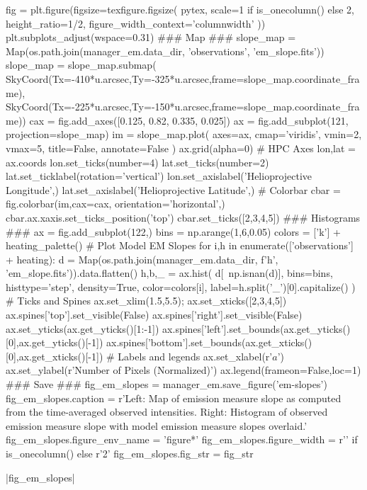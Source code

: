 \begin{pycode}[manager_em]
fig = plt.figure(figsize=texfigure.figsize(
    pytex,
    scale=1 if is_onecolumn() else 2,
    height_ratio=1/2,
    figure_width_context='columnwidth'
))
plt.subplots_adjust(wspace=0.31)
### Map ###
slope_map = Map(os.path.join(manager_em.data_dir, 'observations', 'em_slope.fits'))
slope_map = slope_map.submap(
    SkyCoord(Tx=-410*u.arcsec,Ty=-325*u.arcsec,frame=slope_map.coordinate_frame),
    SkyCoord(Tx=-225*u.arcsec,Ty=-150*u.arcsec,frame=slope_map.coordinate_frame))
cax = fig.add_axes([0.125, 0.82, 0.335, 0.025])
ax = fig.add_subplot(121, projection=slope_map)
im = slope_map.plot(
    axes=ax,
    cmap='viridis',
    vmin=2, vmax=5,
    title=False, annotate=False
)
ax.grid(alpha=0)
# HPC Axes
lon,lat = ax.coords
lon.set_ticks(number=4)
lat.set_ticks(number=2)
lat.set_ticklabel(rotation='vertical')
lon.set_axislabel('Helioprojective Longitude',)
lat.set_axislabel('Helioprojective Latitude',)
# Colorbar
cbar = fig.colorbar(im,cax=cax, orientation='horizontal',)
cbar.ax.xaxis.set_ticks_position('top')
cbar.set_ticks([2,3,4,5])
### Histograms ###
ax = fig.add_subplot(122,)
bins = np.arange(1,6,0.05)
colors = ['k'] + heating_palette()
# Plot Model EM Slopes
for i,h in enumerate(['observations'] + heating):
    d = Map(os.path.join(manager_em.data_dir, f'{h}', 'em_slope.fits')).data.flatten()
    h,b,_ = ax.hist(
        d[~np.isnan(d)],
        bins=bins,
        histtype='step',
        density=True,
        color=colors[i],
        label=h.split('_')[0].capitalize()
    )
# Ticks and Spines
ax.set_xlim(1.5,5.5);
ax.set_xticks([2,3,4,5])
ax.spines['top'].set_visible(False)
ax.spines['right'].set_visible(False)
ax.set_yticks(ax.get_yticks()[1:-1])
ax.spines['left'].set_bounds(ax.get_yticks()[0],ax.get_yticks()[-1])
ax.spines['bottom'].set_bounds(ax.get_xticks()[0],ax.get_xticks()[-1])
# Labels and legends
ax.set_xlabel(r'$a$')
ax.set_ylabel(r'Number of Pixels (Normalized)')
ax.legend(frameon=False,loc=1)
### Save ###
fig_em_slopes = manager_em.save_figure('em-slopes')
fig_em_slopes.caption = r'Left: Map of emission measure slope as computed from the time-averaged observed intensities. Right: Histogram of observed emission measure slope with model emission measure slopes overlaid.'
fig_em_slopes.figure_env_name = 'figure*'
fig_em_slopes.figure_width = r'\columnwidth' if is_onecolumn() else r'2\columnwidth'
fig_em_slopes.fig_str = fig_str
\end{pycode}
\py[manager_em]|fig_em_slopes|

